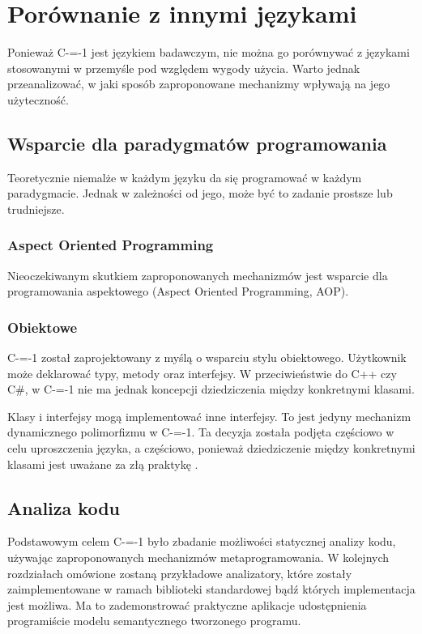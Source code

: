 \section{Porównanie z innymi językami}
Ponieważ C-=-1 jest językiem badawczym, nie można go porównywać z językami stosowanymi w przemyśle pod względem wygody użycia.
Warto jednak przeanalizować, w jaki sposób zaproponowane mechanizmy wpływają na jego użyteczność.

\subsection{Wsparcie dla paradygmatów programowania}
Teoretycznie niemalże w każdym języku da się programować w każdym paradygmacie. Jednak w zależności od jego, może być to zadanie prostsze lub trudniejsze. 

\subsubsection{Aspect Oriented Programming}
Nieoczekiwanym skutkiem zaproponowanych mechanizmów jest wsparcie dla programowania aspektowego (Aspect Oriented Programming, AOP).

\subsubsection{Obiektowe}
C-=-1 został zaprojektowany z myślą o wsparciu stylu obiektowego. Użytkownik może deklarować typy, metody oraz interfejsy. W przeciwieństwie do C++ czy C\#, w C-=-1 nie ma jednak koncepcji dziedziczenia między konkretnymi klasami.

Klasy i interfejsy mogą implementować inne interfejsy.
To jest jedyny mechanizm dynamicznego polimorfizmu w C-=-1.
Ta decyzja została podjęta częściowo w celu uproszczenia języka, a częściowo, ponieważ dziedziczenie między konkretnymi klasami jest uważane za złą praktykę \cite{gang_of_four:design_patterns}.

\subsection{Analiza kodu}
Podstawowym celem C-=-1 było zbadanie możliwości statycznej analizy kodu, używając zaproponowanych mechanizmów metaprogramowania.
W kolejnych rozdziałach omówione zostaną przykładowe analizatory, które zostały zaimplementowane w ramach biblioteki standardowej bądź których implementacja jest możliwa.
Ma to zademonstrować praktyczne aplikacje udostępnienia programiście modelu semantycznego tworzonego programu.



